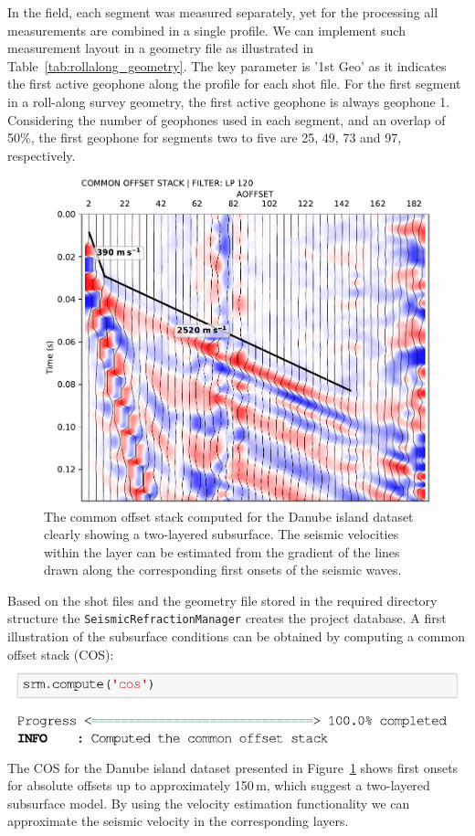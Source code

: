 \documentclass[a4paper,fleqn]{cas-sc}
\begin{document}
In the field, each segment was measured separately, yet for the processing all measurements are combined in a single profile. 
We can implement such measurement layout in a geometry file 
as illustrated in Table~\ref{tab:rollalong_geometry}. 
The key parameter is '1st Geo' as it indicates the first active geophone along the profile for each shot file. For the first segment in a roll-along survey geometry, the first active geophone is always geophone 1. Considering the number of geophones used in each segment, and an overlap of 50\%, the first geophone for segments two to five are 25, 49, 73 and 97, respectively.

\begin{figure}
	\centering
	\includegraphics[width=.75\textwidth]{figures/danube_island_cos_lp120.pdf}
	\caption{The common offset stack computed for the Danube island dataset clearly showing a two-layered subsurface. The seismic velocities within the layer can be estimated from the gradient of the lines drawn along the corresponding first onsets of the seismic waves.}
	\label{fig:fieldcos}
\end{figure}

Based on the shot files and the geometry file stored in the required directory structure the \texttt{SeismicRefractionManager} creates the project database.
A first illustration of the subsurface conditions can be obtained by computing a common offset stack (COS):
\newline
\includegraphics[width=.5\textwidth]{./figures/plotcos_danube.pdf}
\newline
The COS for the Danube island dataset presented in Figure~\ref{fig:fieldcos} shows first onsets for absolute offsets up to approximately 150\,m, which suggest a two-layered subsurface model. By using the velocity estimation functionality we can approximate the seismic velocity in the corresponding layers.
\end{document}
